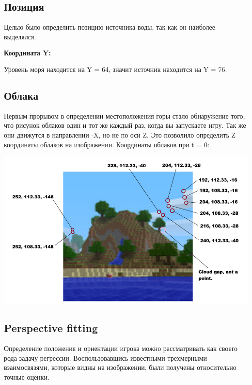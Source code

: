 \subsection{Позиция}
Целью было определить позицию источника воды, так как он наиболее выделялся.

\textbf{Координата Y:} %

Уровень моря находится на Y = 64, значит источник находится на Y = 76.

\subsection{Облака}
Первым прорывом в определении местоположения горы стало обнаружение того, что рисунок облаков один и тот же каждый раз, когда вы запускаете игру. Так же они движутся в направлении -X, но не по оси Z. Это позволило определить Z координаты облаков на изображении.  
Координаты облаков при t = 0:

\begin{center}
    \includegraphics[width=\linewidth]{clouds.png}
\end{center}

\subsection{Perspective fitting}

Определение положения и ориентации игрока можно рассматривать как своего рода задачу регрессии. Воспользовавшись известными трехмерными взаимосвязями, которые видны на изображении, были получены относительно точные оценки.

